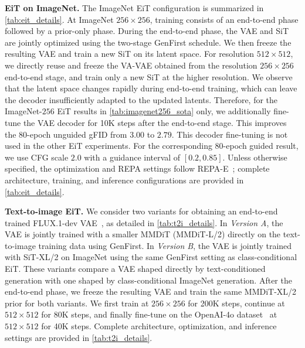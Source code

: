 \textbf{EiT on ImageNet.}
The ImageNet EiT configuration is summarized in \cref{tab:eit_details}.
At ImageNet $256\times256$, training consists of an end-to-end phase followed by a prior-only phase. 
During the end-to-end phase, the VAE and SiT are jointly optimized using the two-stage GenFirst schedule. 
We then freeze the resulting VAE and train a new SiT on its latent space. 
For resolution $512\times512$, we directly reuse and freeze the VA-VAE obtained from the resolution $256\times256$ end-to-end stage, and train only a new SiT at the higher resolution.
We observe that the latent space changes rapidly during end-to-end training, which can leave the decoder insufficiently adapted to the updated latents.
Therefore, for the ImageNet-$256$ EiT results in \cref{tab:imagenet256_sota} only, we additionally fine-tune the VAE decoder for 10K steps after the end-to-end stage. This improves the 80-epoch unguided gFID from $3.00$ to $2.79$. 
This decoder fine-tuning is not used in the other EiT experiments.
For the corresponding 80-epoch guided result, we use CFG scale $2.0$ with a guidance interval of $[0.2,0.85]$.
Unless otherwise specified, the optimization and REPA settings follow REPA-E~\cite{repa_e}; complete architecture, training, and inference configurations are provided in \cref{tab:eit_details}.

\textbf{Text-to-image EiT.}
We consider two variants for obtaining an end-to-end trained FLUX.1-dev VAE~\cite{flux1}, as detailed in \cref{tab:t2i_details}.
In \textit{Version A}, the VAE is jointly trained with a smaller MMDiT (MMDiT-L/2) directly on the text-to-image training data using GenFirst.
In \textit{Version B}, the VAE is jointly trained with SiT-XL/2 on ImageNet using the same GenFirst setting as class-conditional EiT.
These variants compare a VAE shaped directly by text-conditioned generation with one shaped by class-conditional ImageNet generation.
After the end-to-end phase, we freeze the resulting VAE and train the same MMDiT-XL/2 prior for both variants.
We first train at $256\times256$ for 200K steps, continue at $512\times512$ for 80K steps, and finally fine-tune on the OpenAI-4o dataset~\cite{open4o} at $512\times512$ for 40K steps.
Complete architecture, optimization, and inference settings are provided in \cref{tab:t2i_details}.

